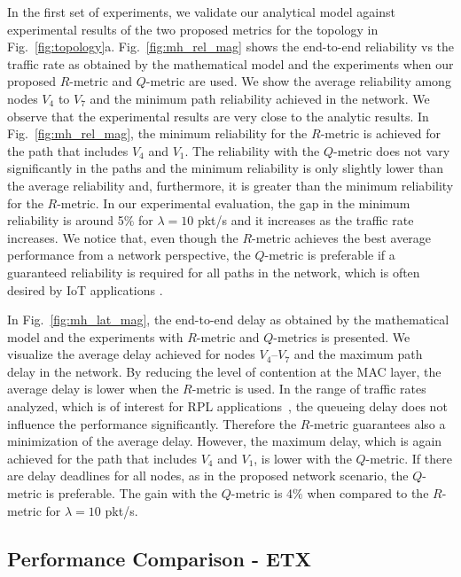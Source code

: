 \documentclass[review, 1p, 11pt]{elsarticle}
\numberwithin{equation}{section}
\begin{document}
In the first set of experiments, we validate our analytical model against experimental results of the two proposed metrics for the topology in Fig.~\ref{fig:topology}a.
Fig.~\ref{fig:mh_rel_mag} shows the end-to-end reliability vs the traffic rate as obtained
by the mathematical model and the experiments when our proposed $R$-metric and $Q$-metric are used.
We show the average reliability among nodes $V_4$ to $V_7$ and
the minimum path reliability achieved in the network. We observe that the experimental results are very close to the analytic results.
In Fig.~\ref{fig:mh_rel_mag}, the minimum reliability for the $R$-metric is achieved for the path that includes $V_4$ and $V_1$.
The reliability with the $Q$-metric does not vary significantly in the paths and the minimum reliability is only slightly lower than the average reliability and, furthermore, it is greater than the minimum reliability for the $R$-metric. In our experimental evaluation, the gap in the minimum reliability is around 5$\%$ for $\lambda=10$ pkt/s and it increases as the traffic rate increases. We notice that, even though the $R$-metric achieves the best average performance from a network perspective, the $Q$-metric is preferable if a guaranteed reliability is required for all paths in the network, which is often desired by IoT applications \cite{palattella_iot}.

In Fig.~\ref{fig:mh_lat_mag}, the end-to-end delay as obtained
by the mathematical model and the experiments with $R$-metric and $Q$-metrics is presented.
We visualize the average delay achieved for nodes $V_4$--$V_7$ and
the maximum path delay in the network.
By reducing the level of contention at the MAC layer, the average delay is lower when the $R$-metric is used.
In the range of traffic rates analyzed, which is of interest for RPL applications~\cite{ROLL}, the queueing delay does not influence the performance significantly. Therefore the $R$-metric guarantees also a minimization of the average delay. However, the maximum delay, which is again achieved  for the path that includes $V_4$ and $V_1$,  is lower with the $Q$-metric.  If there are delay deadlines for all nodes, as in the proposed network scenario, the $Q$-metric is preferable. The gain with the $Q$-metric is 4$\%$ when compared to the $R$-metric for  $\lambda=10$ pkt/s.



\subsection{Performance Comparison - ETX}
\end{document}
